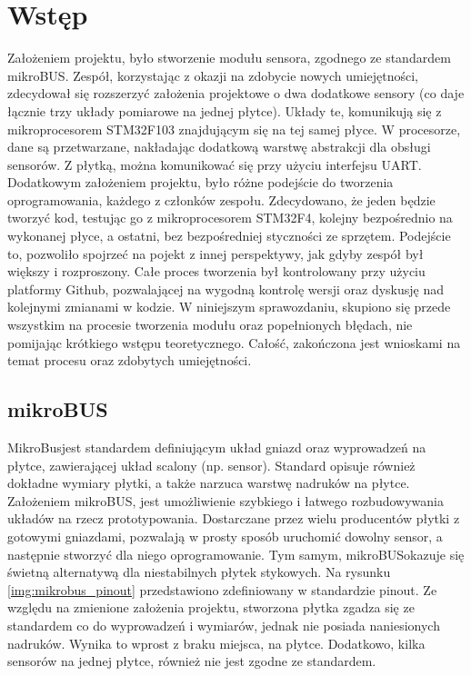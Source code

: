 \chapter{Wstęp}
\label{cha:introduction}
Założeniem projektu, było stworzenie modułu sensora, zgodnego ze standardem mikroBUS\texttrademark. Zespół, korzystając z okazji na zdobycie nowych umiejętności, zdecydował się rozszerzyć założenia projektowe o dwa dodatkowe sensory (co daje łącznie trzy układy pomiarowe na jednej płytce). Układy te, komunikują się z mikroprocesorem STM32F103 znajdującym się na tej samej płyce. W procesorze, dane są przetwarzane, nakładając dodatkową warstwę abstrakcji dla obsługi sensorów. Z płytką, można komunikować się przy użyciu interfejsu UART. Dodatkowym założeniem projektu, było różne podejście do tworzenia oprogramowania, każdego z członków zespołu. Zdecydowano, że jeden będzie tworzyć kod, testując go z mikroprocesorem STM32F4, kolejny bezpośrednio na wykonanej płyce, a ostatni, bez bezpośredniej styczności ze sprzętem. Podejście to, pozwoliło spojrzeć na pojekt z innej perspektywy, jak gdyby zespół był większy i rozproszony. Całe proces tworzenia był kontrolowany przy użyciu platformy Github, pozwalającej na wygodną kontrolę wersji oraz dyskusję nad kolejnymi zmianami w kodzie. \newline
W niniejszym sprawozdaniu, skupiono się przede wszystkim na procesie tworzenia modułu oraz popełnionych błędach, nie pomijając krótkiego wstępu teoretycznego. Całość, zakończona jest wnioskami na temat procesu oraz zdobytych umiejętności.
\section{mikroBUS\texttrademark}
MikroBus\texttrademark jest standardem definiującym układ gniazd oraz wyprowadzeń na płytce, zawierającej układ scalony (np. sensor). Standard opisuje również dokładne wymiary płytki, a także narzuca warstwę nadruków na płytce. Założeniem mikroBUS\texttrademark, jest umożliwienie szybkiego i łatwego rozbudowywania układów na rzecz prototypowania. Dostarczane przez wielu producentów płytki z gotowymi gniazdami, pozwalają w prosty sposób uruchomić dowolny sensor, a następnie stworzyć dla niego oprogramowanie. Tym samym, mikroBUS\texttrademark okazuje się świetną alternatywą dla niestabilnych płytek stykowych. Na rysunku \ref{img:mikrobus_pinout} przedstawiono zdefiniowany w standardzie pinout. \newline
Ze względu na zmienione założenia projektu, stworzona płytka zgadza się ze standardem co do wyprowadzeń i wymiarów, jednak nie posiada naniesionych nadruków. Wynika to wprost z braku miejsca, na płytce. Dodatkowo, kilka sensorów na jednej płytce, również nie jest zgodne ze standardem.

